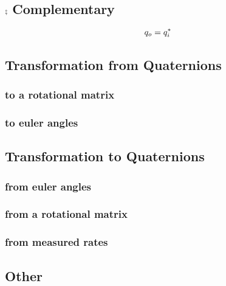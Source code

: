 
\subsection{$\comp{}$ Complementary}
\begin{equation}
q_{o} = q_{i}^*
\end{equation}



\subsection{Transformation from Quaternions}
\subsubsection*{to a rotational matrix}


\subsubsection*{to euler angles}




\subsection{Transformation to Quaternions}
\subsubsection*{from euler angles}


\subsubsection*{from a rotational matrix}


\subsubsection*{from measured rates}




\subsection{Other}

